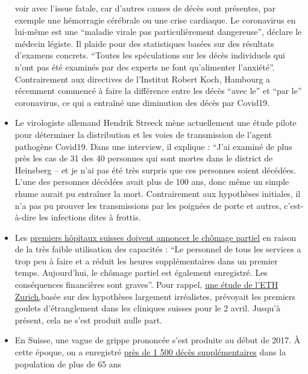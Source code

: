 \begin{itemize}
  voir avec l'issue fatale, car d'autres causes de décès sont présentes,
  par exemple une hémorragie cérébrale ou une crise cardiaque. Le
  coronavirus en lui-même est une ``maladie virale pas particulièrement
  dangereuse'', déclare le médecin légiste. Il plaide pour des
  statistiques basées sur des résultats d'examens concrets. ``Toutes les
  spéculations sur les décès individuels qui n'ont pas été examinés par
  des experts ne font qu'alimenter l'anxiété''. Contrairement aux
  directives de l'Institut Robert Koch, Hambourg a récemment commencé à
  faire la différence entre les décès ``avec le'' et ``par le''
  coronavirus, ce qui a entraîné une diminution des décès par Covid19.
\item
  Le virologiste allemand Hendrik Streeck mène actuellement une étude
  pilote pour déterminer la distribution et les voies de transmission de
  l'agent pathogène Covid19. Dans une interview, il explique : ``J'ai
  examiné de plus près les cas de 31 des 40 personnes qui sont mortes
  dans le district de Heinsberg -- et je n'ai pas été très surpris que
  ces personnes soient décédées. L'une des personnes décédées avait plus
  de 100 ans, donc même un simple rhume aurait pu entraîner la mort.
  Contrairement aux hypothèses initiales, il n'a pas pu prouver les
  transmissions par les poignées de porte et autres, c'est-à-dire les
  infections dites à frottis.
\item
  Les
  \href{https://www.engadinerpost.ch/2020/4/04/Engadiner-Spitaeler-haben-freie-Kapazitaeten}{premiers
  hôpitaux suisses doivent annoncer le chômage partiel} en raison de la
  très faible utilisation des capacités : ``Le personnel de tous les
  services a trop peu à faire et a réduit les heures supplémentaires
  dans un premier temps. Aujourd'hui, le chômage partiel est également
  enregistré. Les conséquences financières sont graves''. Pour rappel,
  \href{https://www.toponline.ch/news/coronavirus/detail/news/studie-bestaetigt-engpass-bei-spitalbetten-steht-kurz-bevor-00131333/}{une
  étude de l'ETH Zurich,}basée sur des hypothèses largement irréalistes,
  prévoyait les premiers goulets d'étranglement dans les cliniques
  suisses pour le 2 avril. Jusqu'à présent, cela ne s'est produit nulle
  part.
\item
  En Suisse, une vague de grippe prononcée s'est produite au début de
  2017. À cette époque, on a enregistré
  \href{https://www.srf.ch/news/schweiz/todesursachen-statistik-woran-die-meisten-schweizerinnen-und-schweizer-sterben}{près
  de 1 500 décès supplémentaires} dans la population de plus de 65 ans

\end{itemize}
